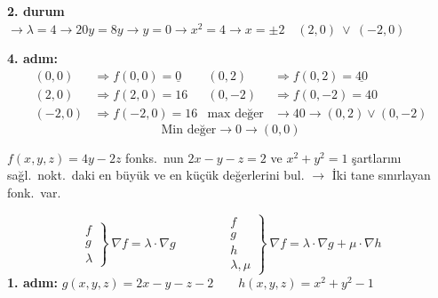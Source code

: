 \documentclass[11pt,a4paper]{article}
\begin{document}
\noindent\textbf{2. durum} $\longrightarrow \lambda=4\longrightarrow 20y=8y\longrightarrow y=0\longrightarrow x^2=4\longrightarrow x=\pm2\quad (2,0)\ \vee\ (-2,0)$

\noindent\textbf{4. adım:}
\begin{align*}
(0,0)&\Longrightarrow f(0,0)=\underline{0} & (0,2)&\Longrightarrow f(0,2)=\underline{40}\\
(2,0)&\Longrightarrow f(2,0)=16 & (0,-2)&\Longrightarrow f(0,-2)=40\\
(-2,0)&\Longrightarrow f(-2,0)=16 & \text{max değer}&\longrightarrow 40\longrightarrow(0,2)\vee(0,-2)
\end{align*}
\[ \text{Min değer}\longrightarrow 0\longrightarrow (0,0) \]

\begin{ornek}
$f(x,y,z)=4y-2z$ fonks.\ nun $2x-y-z=2$ ve $x^2+y^2=1$ şartlarını sağl.\ nokt.\ daki en büyük ve en küçük değerlerini bul. \quad $\longrightarrow$ İki tane sınırlayan fonk.\ var.
\end{ornek}
\[ \left.\begin{matrix} f\\ g\\ \lambda \end{matrix}\right\}\ \nabla f=\lambda\cdot\nabla g
\qquad\qquad
\left.\begin{matrix} f\\ g\\ h\\ \lambda,\mu \end{matrix}\right\}\ \nabla f=\lambda\cdot\nabla g+\mu\cdot\nabla h \]
\noindent\textbf{1. adım:} $g(x,y,z)=2x-y-z-2\qquad h(x,y,z)=x^2+y^2-1$
\end{document}
